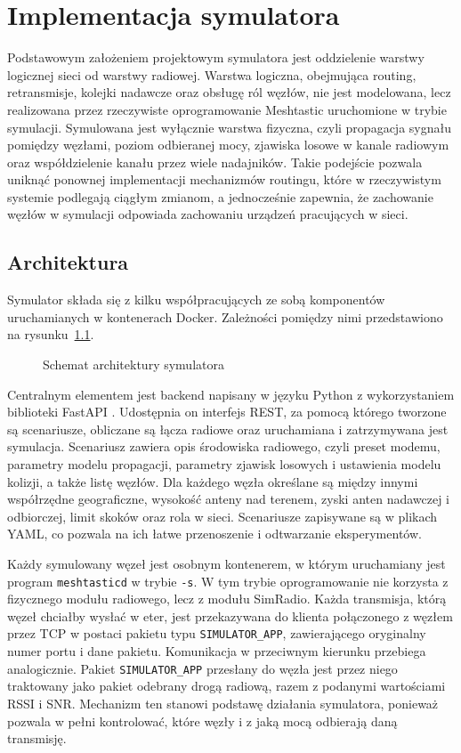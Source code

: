 \chapter{Implementacja symulatora}
\label{chap:implementacja}

Podstawowym założeniem projektowym symulatora jest oddzielenie warstwy logicznej sieci od warstwy radiowej. Warstwa logiczna, obejmująca routing, retransmisje, kolejki nadawcze oraz obsługę ról węzłów, nie jest modelowana, lecz realizowana przez rzeczywiste oprogramowanie Meshtastic uruchomione w trybie symulacji. Symulowana jest wyłącznie warstwa fizyczna, czyli propagacja sygnału pomiędzy węzłami, poziom odbieranej mocy, zjawiska losowe w kanale radiowym oraz współdzielenie kanału przez wiele nadajników. Takie podejście pozwala uniknąć ponownej implementacji mechanizmów routingu, które w rzeczywistym systemie podlegają ciągłym zmianom, a jednocześnie zapewnia, że zachowanie węzłów w symulacji odpowiada zachowaniu urządzeń pracujących w sieci.

\section{Architektura}

Symulator składa się z kilku współpracujących ze sobą komponentów uruchamianych w kontenerach Docker. Zależności pomiędzy nimi przedstawiono na rysunku~\ref{rys:architektura}.

\begin{figure}[ht]
\centering

\caption{Schemat architektury symulatora}
\label{rys:architektura}
\end{figure}

Centralnym elementem jest backend napisany w języku Python z wykorzystaniem biblioteki FastAPI \cite{fastapi}. Udostępnia on interfejs REST, za pomocą którego tworzone są scenariusze, obliczane są łącza radiowe oraz uruchamiana i zatrzymywana jest symulacja. Scenariusz zawiera opis środowiska radiowego, czyli preset modemu, parametry modelu propagacji, parametry zjawisk losowych i ustawienia modelu kolizji, a także listę węzłów. Dla każdego węzła określane są między innymi współrzędne geograficzne, wysokość anteny nad terenem, zyski anten nadawczej i odbiorczej, limit skoków oraz rola w sieci. Scenariusze zapisywane są w plikach YAML, co pozwala na ich łatwe przenoszenie i odtwarzanie eksperymentów.

Każdy symulowany węzeł jest osobnym kontenerem, w którym uruchamiany jest program \texttt{meshtasticd} w trybie \texttt{-s}. W tym trybie oprogramowanie nie korzysta z fizycznego modułu radiowego, lecz z modułu SimRadio. Każda transmisja, którą węzeł chciałby wysłać w eter, jest przekazywana do klienta połączonego z węzłem przez TCP w postaci pakietu typu \texttt{SIMULATOR\_APP}, zawierającego oryginalny numer portu i dane pakietu. Komunikacja w przeciwnym kierunku przebiega analogicznie. Pakiet \texttt{SIMULATOR\_APP} przesłany do węzła jest przez niego traktowany jako pakiet odebrany drogą radiową, razem z podanymi wartościami RSSI i SNR. Mechanizm ten stanowi podstawę działania symulatora, ponieważ pozwala w pełni kontrolować, które węzły i z jaką mocą odbierają daną transmisję.

